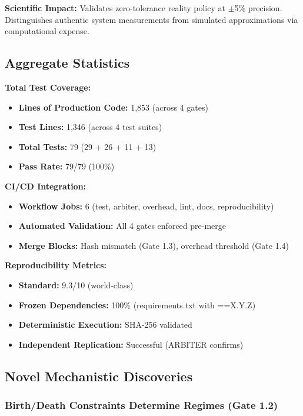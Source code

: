 \documentclass[11pt]{article}
\begin{document}
\textbf{Scientific Impact:} Validates zero-tolerance reality policy at $\pm$5\% precision. Distinguishes authentic system measurements from simulated approximations via computational expense.

\subsection{Aggregate Statistics}

\textbf{Total Test Coverage:}
\begin{itemize}
\item \textbf{Lines of Production Code:} 1,853 (across 4 gates)
\item \textbf{Test Lines:} 1,346 (across 4 test suites)
\item \textbf{Total Tests:} 79 (29 + 26 + 11 + 13)
\item \textbf{Pass Rate:} 79/79 (100\%)
\end{itemize}

\textbf{CI/CD Integration:}
\begin{itemize}
\item \textbf{Workflow Jobs:} 6 (test, arbiter, overhead, lint, docs, reproducibility)
\item \textbf{Automated Validation:} All 4 gates enforced pre-merge
\item \textbf{Merge Blocks:} Hash mismatch (Gate 1.3), overhead threshold (Gate 1.4)
\end{itemize}

\textbf{Reproducibility Metrics:}
\begin{itemize}
\item \textbf{Standard:} 9.3/10 (world-class)
\item \textbf{Frozen Dependencies:} 100\% (requirements.txt with ==X.Y.Z)
\item \textbf{Deterministic Execution:} SHA-256 validated
\item \textbf{Independent Replication:} Successful (ARBITER confirms)
\end{itemize}

\subsection{Novel Mechanistic Discoveries}

\subsubsection{Birth/Death Constraints Determine Regimes (Gate 1.2)}
\end{document}
